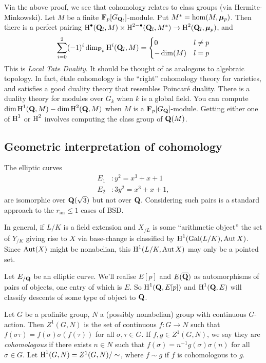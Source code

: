 Via the above proof, we see that cohomology relates to class groups (via 
Hermite-Minkowski). Let $M$ be a finite $\mathbf{F}_p[G_{\mathbf{Q}_l}]$-module. Put 
$M^\ast=\hom(M,{\bm\mu}_p)$. Then there is a 
perfect pairing 
$\operatorname{H}^\bullet(\mathbf{Q}_l,M)\times \operatorname{H}^{2-\bullet}(\mathbf{Q}_l,M^\ast)\to \operatorname{H}^2(\mathbf{Q}_l,{\bm\mu}_p)$, 
and 
\[
  \sum_{i=0}^2 (-1)^i\dim_{\mathbf{F}_p} \operatorname{H}^i(\mathbf{Q}_l,M) = \begin{cases} 0 & l\ne p \\ -\dim(M) & l = p \end{cases}
\]
This is \emph{Local Tate Duality}. It should be thought of as analogous 
to algebraic topology. In fact, \'etale cohomology is the ``right'' cohomology 
theory for varieties, and satisfies a good duality theory that resembles 
Poincar\'e duality. There is a duality theory for modules over $G_k$ when $k$ 
is a global field. You can compute 
$\dim \operatorname{H}^1(\mathbf{Q},M)-\dim \operatorname{H}^2(\mathbf{Q},M)$ when $M$ is a $\mathbf{F}_p[G_{\mathbf{Q}}]$-module. 
Getting either one of $\operatorname{H}^1$ or $\operatorname{H}^2$ involves computing the class group of 
$\mathbf{Q}(M)$. 





\subsection{Geometric interpretation of cohomology}

The elliptic curves 
\begin{align*}
  E_1 &: y^2=x^3+x+1 \\
  E_2 &: 3 y^2=x^3+x+1 ,
\end{align*}
are isomorphic over $\mathbf{Q}(\sqrt 3)$ but not over $\mathbf{Q}$. Considering such pairs 
is a standard approach to the $r_\mathrm{an}\leqslant 1$ cases of BSD. 

In general, if $L/K$ is a field extension and $X_{/L}$ is some ``arithmetic 
object'' the set of $Y_{/K}$ giving rise to $X$ via base-change is classified 
by $\operatorname{H}^1(\operatorname{Gal}(L/K),\operatorname{Aut} X)$. Since $\operatorname{Aut}(X)$ might be 
nonabelian, this $\operatorname{H}^1(L/K,\operatorname{Aut} X)$ may only be a pointed set. 

Let $E_{/\mathbf{Q}}$ be an elliptic curve. We'll realise $E[p]$ and 
$E(\overline{\mathbf{Q}})$ as automorphisms of pairs of objects, one entry of which is 
$E$. So $\operatorname{H}^1(\mathbf{Q},E[p])$ and $\operatorname{H}^1(\mathbf{Q},E)$ will classify descents of some type 
of object to $\mathbf{Q}$. 

\begin{definition}
Let $G$ be a profinite group, $N$ a (possibly nonabelian) group with 
continuous $G$-action. Then $Z^1(G,N)$ is the set of continuous 
$f:G\to N$ such that $f(\sigma\tau)=f(\sigma)\sigma(f(\tau))$ for all 
$\sigma,\tau\in G$. If $f,g\in Z^1(G,N)$, we say they are 
\emph{cohomologous} if there exists $n\in N$ such that 
$f(\sigma)=n^{-1} g(\sigma) \sigma(n)$ for all $\sigma\in G$. Let 
$\operatorname{H}^1(G,N)=Z^1(G,N)/\sim$, where $f\sim g$ if $f$ is cohomologous to $g$. 
\end{definition}

